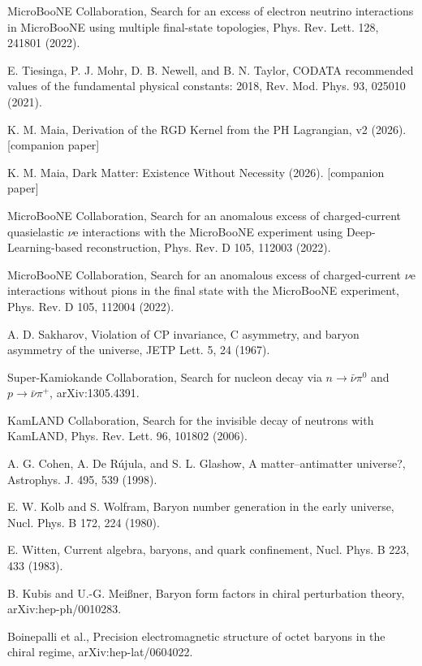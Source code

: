 \documentclass[11pt,letterpaper]{article}
\begin{document}
\noindent [10] MicroBooNE Collaboration, Search for an excess of electron neutrino interactions in MicroBooNE using multiple final-state topologies, Phys. Rev. Lett. 128, 241801 (2022).

\noindent [11] E. Tiesinga, P. J. Mohr, D. B. Newell, and B. N. Taylor, CODATA recommended values of the fundamental physical constants: 2018, Rev. Mod. Phys. 93, 025010 (2021).

\noindent [12] K. M. Maia, Derivation of the RGD Kernel from the PH Lagrangian, v2 (2026). [companion paper]

\noindent [13] K. M. Maia, Dark Matter: Existence Without Necessity (2026). [companion paper]

\noindent [14] MicroBooNE Collaboration, Search for an anomalous excess of charged-current quasielastic $\nu$e interactions with the MicroBooNE experiment using Deep-Learning-based reconstruction, Phys. Rev. D 105, 112003 (2022).

\noindent [15] MicroBooNE Collaboration, Search for an anomalous excess of charged-current $\nu$e interactions without pions in the final state with the MicroBooNE experiment, Phys. Rev. D 105, 112004 (2022).


\noindent [16] A. D. Sakharov, Violation of CP invariance, C asymmetry, and baryon asymmetry of the universe, JETP Lett. 5, 24 (1967).

\noindent [17] Super-Kamiokande Collaboration, Search for nucleon decay via $n\to\bar\nu\pi^0$ and $p\to\bar\nu\pi^+$, arXiv:1305.4391.

\noindent [18] KamLAND Collaboration, Search for the invisible decay of neutrons with KamLAND, Phys. Rev. Lett. 96, 101802 (2006).

\noindent [19] A. G. Cohen, A. De R\'ujula, and S. L. Glashow, A matter--antimatter universe?, Astrophys. J. 495, 539 (1998).

\noindent [20] E. W. Kolb and S. Wolfram, Baryon number generation in the early universe, Nucl. Phys. B 172, 224 (1980).

\noindent [21] E. Witten, Current algebra, baryons, and quark confinement, Nucl. Phys. B 223, 433 (1983).

\noindent [22] B. Kubis and U.-G. Mei\ss ner, Baryon form factors in chiral perturbation theory, arXiv:hep-ph/0010283.

\noindent [23] Boinepalli et al., Precision electromagnetic structure of octet baryons in the chiral regime, arXiv:hep-lat/0604022.
\end{document}
